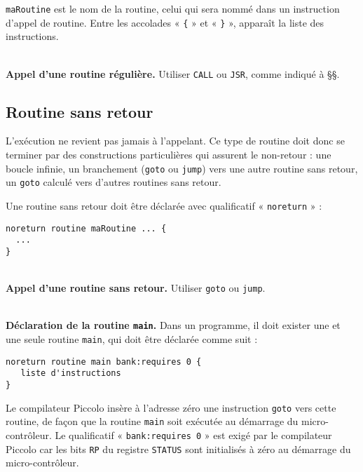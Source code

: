 \texttt{maRoutine} est le nom de la routine, celui qui sera nommé dans un instruction d’appel de routine. Entre les accolades « \texttt{\{} » et « \texttt{\}} », apparaît la liste des instructions.

~\\
\textbf{Appel d’une routine régulière.} Utiliser \texttt{CALL} ou \texttt{JSR}, comme indiqué à §§.

\subsection{Routine sans retour}

L’exécution ne revient pas jamais à l’appelant. Ce type de routine doit donc se terminer par des constructions particulières qui assurent le non-retour : une boucle infinie, un branchement (\texttt{goto} ou \texttt{jump}) vers une autre routine sans retour, un \texttt{goto} calculé vers d’autres routines sans retour.

Une routine sans retour doit être déclarée avec qualificatif « \texttt{noreturn} » :
\begin{lstlisting}[language=piccolo]
noreturn routine maRoutine ... {
  ...
}
\end{lstlisting}

~\\
\textbf{Appel d’une routine sans retour.} Utiliser \texttt{goto} ou \texttt{jump}.


~\\
\textbf{Déclaration de la routine \texttt{main}.} Dans un programme, il doit exister une et une seule routine \texttt{main}, qui doit être déclarée comme suit :

\begin{lstlisting}[language=piccolo]
noreturn routine main bank:requires 0 {
   liste d'instructions
}

\end{lstlisting}

Le compilateur Piccolo insère à l’adresse zéro une instruction \texttt{goto} vers cette routine, de façon que la routine \texttt{main} soit exécutée au démarrage du micro-contrôleur. Le qualificatif « \texttt{bank:requires 0} » est exigé par le compilateur Piccolo car les bits \texttt{RP} du registre \texttt{STATUS} sont initialisés à zéro au démarrage du micro-contrôleur.


